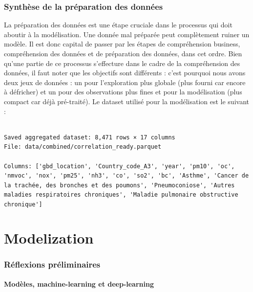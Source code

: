 \documentclass[11pt,a4paper]{article}
\newcommand{\currentpart}{}
\let\oldpart\part
\renewcommand{\part}[1]{%
  \oldpart{#1}%
  \renewcommand{\currentpart}{\thepart.\ #1}%
  \markboth{\currentpart}{}%
}
\begin{document}
\section{Synthèse de la préparation des données}

La préparation des données est une étape cruciale dans le processus qui doit aboutir à la modélisation. Une donnée mal préparée peut complètement ruiner un modèle. Il est donc capital de passer par les étapes de compréhension business, compréhension des données et de préparation des données, dans cet ordre. Bien qu'une partie de ce processus s'effecture dans le cadre de la compréhension des données, il faut noter que les objectifs sont différents : c'est pourquoi nous avons deux jeux de données : un pour l'exploration plus globale (plus fourni car encore à défricher) et un pour des observations plus fines et pour la modélisation (plus compact car déjà pré-traité). Le dataset utilisé pour la modélisation est le suivant :

\begin{listing}[H]
\caption{Sortie du script de préparation des données et présentation du dataset final}
\label{lst:final-dataset}
\begin{lstlisting}[style=textstyle]

Saved aggregated dataset: 8,471 rows × 17 columns
File: data/combined/correlation_ready.parquet

Columns: ['gbd_location', 'Country_code_A3', 'year', 'pm10', 'oc', 'nmvoc', 'nox', 'pm25', 'nh3', 'co', 'so2', 'bc', 'Asthme', 'Cancer de la trachée, des bronches et des poumons', 'Pneumoconiose', 'Autres maladies respiratoires chroniques', 'Maladie pulmonaire obstructive chronique']

\end{lstlisting}
\end{listing}

\clearpage
\part{Modelization}

\section{Réflexions préliminaires}

\subsection{Modèles, machine-learning et deep-learning}
\end{document}
